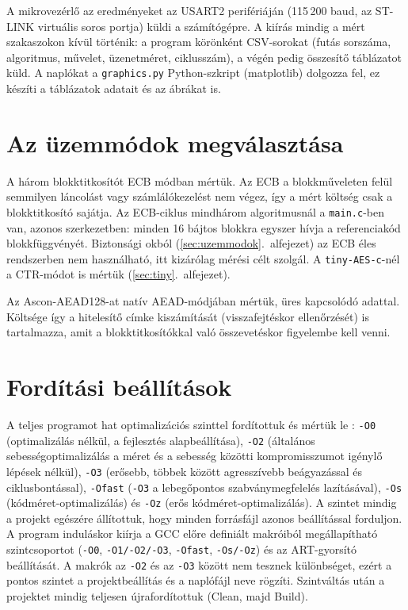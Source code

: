 \documentclass[a4paper,12pt]{report}
\theoremstyle{definition}
\theoremstyle{remark}
\begin{document}
A mikrovezérlő az eredményeket az USART2 perifériáján (115\,200 baud, az ST-LINK virtuális soros portja) küldi a számítógépre. A kiírás mindig a mért szakaszokon kívül történik: a program körönként CSV-sorokat (futás sorszáma, algoritmus, művelet, üzenetméret, ciklusszám), a végén pedig összesítő táblázatot küld. A naplókat a \texttt{graphics.py} Python-szkript (matplotlib) dolgozza fel, ez készíti a táblázatok adatait és az ábrákat is.

\section{Az üzemmódok megválasztása}\label{sec:uzemmod_valasztas}

A három blokktitkosítót ECB módban mértük. Az ECB a blokkműveleten felül semmilyen láncolást vagy számlálókezelést nem végez, így a mért költség csak a blokktitkosító sajátja. Az ECB-ciklus mindhárom algoritmusnál a \texttt{main.c}-ben van, azonos szerkezetben: minden 16 bájtos blokkra egyszer hívja a referenciakód blokkfüggvényét. Biztonsági okból (\ref{sec:uzemmodok}.~alfejezet) az ECB éles rendszerben nem használható, itt kizárólag mérési célt szolgál. A \texttt{tiny-AES-c}-nél a CTR-módot is mértük (\ref{sec:tiny}.~alfejezet).

Az Ascon-AEAD128-at natív AEAD-módjában mértük, üres kapcsolódó adattal. Költsége így a hitelesítő címke kiszámítását (visszafejtéskor ellenőrzését) is tartalmazza, amit a blokktitkosítókkal való összevetéskor figyelembe kell venni.

\section{Fordítási beállítások}\label{sec:forditas}

A teljes programot hat optimalizációs szinttel fordítottuk és mértük le \cite{GCCopt}: \texttt{-O0} (optimalizálás nélkül, a fejlesztés alapbeállítása), \texttt{-O2} (általános sebességoptimalizálás a méret és a sebesség közötti kompromisszumot igénylő lépések nélkül), \texttt{-O3} (erősebb, többek között agresszívebb beágyazással és ciklusbontással), \texttt{-Ofast} (\texttt{-O3} a lebegőpontos szabványmegfelelés lazításával), \texttt{-Os} (kódméret-optimalizálás) és \texttt{-Oz} (erős kódméret-optimalizálás). A szintet mindig a projekt egészére állítottuk, hogy minden forrásfájl azonos beállítással forduljon. A program induláskor kiírja a GCC előre definiált makróiból megállapítható szintcsoportot (\texttt{-O0}, \texttt{-O1/-O2/-O3}, \texttt{-Ofast}, \texttt{-Os/-Oz}) és az ART-gyorsító beállítását. A makrók az \texttt{-O2} és az \texttt{-O3} között nem tesznek különbséget, ezért a pontos szintet a projektbeállítás és a naplófájl neve rögzíti. Szintváltás után a projektet mindig teljesen újrafordítottuk (Clean, majd Build).
\end{document}

